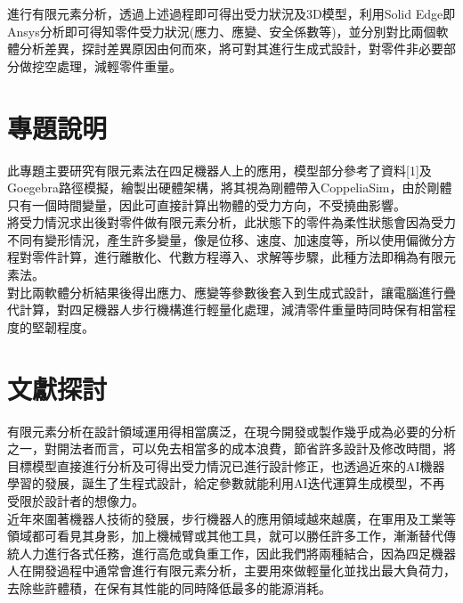進行有限元素分析，透過上述過程即可得出受力狀況及3D模型，利用Solid Edge即Ansys分析即可得知零件受力狀況(應力、應變、安全係數等)，並分別對比兩個軟體分析差異，探討差異原因由何而來，將可對其進行生成式設計，對零件非必要部分做挖空處理，減輕零件重量。

\section{專題說明}
此專題主要研究有限元素法在四足機器人上的應用，模型部分參考了資料[1]及Goegebra路徑模擬，繪製出硬體架構，將其視為剛體帶入CoppeliaSim，由於剛體只有一個時間變量，因此可直接計算出物體的受力方向，不受撓曲影響。\\

將受力情況求出後對零件做有限元素分析，此狀態下的零件為柔性狀態會因為受力不同有變形情況，產生許多變量，像是位移、速度、加速度等，所以使用偏微分方程對零件計算，進行離散化、代數方程導入、求解等步驟，此種方法即稱為有限元素法。\\

對比兩軟體分析結果後得出應力、應變等參數後套入到生成式設計，讓電腦進行疊代計算，對四足機器人步行機構進行輕量化處理，減清零件重量時同時保有相當程度的堅韌程度。\\

\section{文獻探討}

有限元素分析在設計領域運用得相當廣泛，在現今開發或製作幾乎成為必要的分析之一，對開法者而言，可以免去相當多的成本浪費，節省許多設計及修改時間，將目標模型直接進行分析及可得出受力情況已進行設計修正，也透過近來的AI機器學習的發展，誕生了生程式設計，給定參數就能利用AI迭代運算生成模型，不再受限於設計者的想像力。\\

近年來圍著機器人技術的發展，步行機器人的應用領域越來越廣，在軍用及工業等領域都可看見其身影，加上機械臂或其他工具，就可以勝任許多工作，漸漸替代傳統人力進行各式任務，進行高危或負重工作，因此我們將兩種結合，因為四足機器人在開發過程中通常會進行有限元素分析，主要用來做輕量化並找出最大負荷力，去除些許體積，在保有其性能的同時降低最多的能源消耗。\\

\renewcommand{\baselinestretch}{0.5} %
